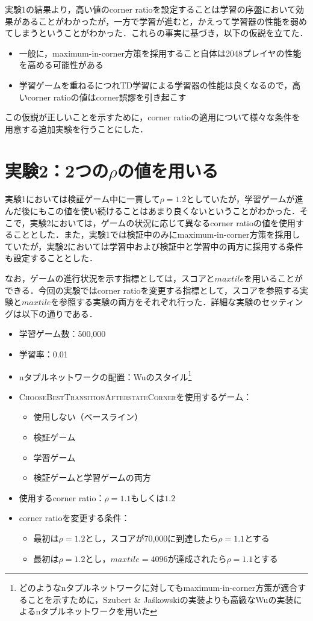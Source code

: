 \documentclass{suribt}
\begin{document}
実験1の結果より，高い値のcorner ratioを設定することは学習の序盤において効果があることがわかったが，一方で学習が進むと，かえって学習器の性能を弱めてしまうということがわかった．これらの事実に基づき，以下の仮説を立てた．

\begin{itemize}
\item 一般に，maximum-in-corner方策を採用すること自体は2048プレイヤの性能を高める可能性がある
\item 学習ゲームを重ねるにつれTD学習による学習器の性能は良くなるので，高いcorner ratioの値はcorner誤謬を引き起こす
\end{itemize}

この仮説が正しいことを示すために，corner ratioの適用について様々な条件を用意する追加実験を行うことにした．

\section{実験2：2つの${\rho}$の値を用いる}
実験1においては検証ゲーム中に一貫して${\rho}=1.2$としていたが，学習ゲームが進んだ後にもこの値を使い続けることはあまり良くないということがわかった．そこで，実験2においては，ゲームの状況に応じて異なるcorner ratioの値を使用することとした．また，実験1では検証中のみにmaximum-in-corner方策を採用していたが，実験2においては学習中および検証中と学習中の両方に採用する条件も設定することとした．

なお，ゲームの進行状況を示す指標としては，スコアと$maxtile$を用いることができる．今回の実験ではcorner ratioを変更する指標として，スコアを参照する実験と$maxtile$を参照する実験の両方をそれぞれ行った．詳細な実験のセッティングは以下の通りである．

\begin{itemize}
\item 学習ゲーム数：500,000
\item 学習率：0.01
\item nタプルネットワークの配置：Wuのスタイル\footnote{どのようなnタプルネットワークに対してもmaximum-in-corner方策が適合することを示すために，Szubert \& Ja\'{s}kowskiの実装よりも高級なWuの実装によるnタプルネットワークを用いた}
\item \textsc{ChooseBestTransitionAfterstateCorner}を使用するゲーム：
\begin{itemize}
\item 使用しない（ベースライン）
\item 検証ゲーム
\item 学習ゲーム
\item 検証ゲームと学習ゲームの両方
\end{itemize}
\item 使用するcorner ratio：${\rho}=1.1 \text{もしくは} 1.2$
\item corner ratioを変更する条件：
\begin{itemize}
\item 最初は${\rho}=1.2$とし，スコアが70,000に到達したら${\rho}=1.1$とする
\item 最初は${\rho}=1.2$とし，$maxtile=4096$が達成されたら${\rho}=1.1$とする
\end{itemize}
\end{itemize}
\end{document}
